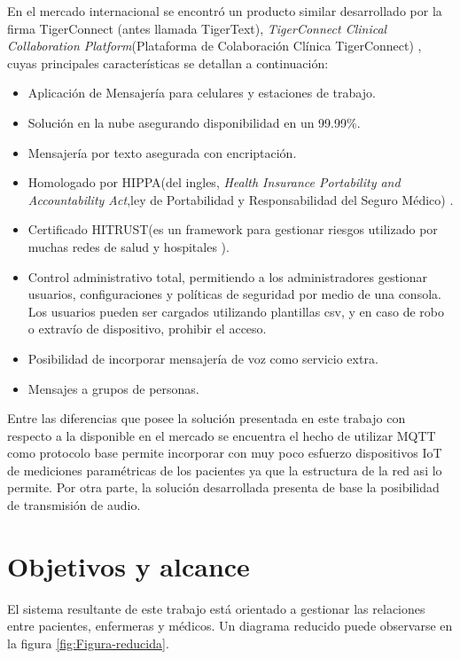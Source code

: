 En el mercado internacional se encontró un producto similar  desarrollado por la firma TigerConnect (antes llamada TigerText), \textit{TigerConnect Clinical Collaboration Platform}(Plataforma de Colaboración Clínica TigerConnect) \citep{WEBSITE:2}, cuyas principales características se detallan a continuación:
\begin{itemize}
\item Aplicación de Mensajería para celulares y estaciones de trabajo.
\item Solución en la nube asegurando disponibilidad en un 99.99\%.
\item Mensajería por texto asegurada con encriptación.  
\item Homologado por HIPPA(del ingles, \textit{Health Insurance Portability and Accountability Act},ley de Portabilidad y Responsabilidad del Seguro Médico)  \citep{WEBSITE:3}.  
\item Certificado HITRUST(es un framework para gestionar riesgos utilizado por muchas redes de salud y hospitales \citep{WEBSITE:1}).  
\item Control administrativo total, permitiendo a los administradores gestionar usuarios, configuraciones y políticas de seguridad por medio de una consola. Los usuarios pueden ser cargados utilizando plantillas csv, y en caso de robo o extravío de dispositivo, prohibir el acceso.  
\item Posibilidad de incorporar mensajería de voz como servicio extra.  
\item Mensajes a grupos de personas.  
\end{itemize}

Entre las diferencias que posee la solución presentada en este trabajo con respecto a la disponible en el mercado se encuentra el hecho de utilizar MQTT como protocolo base permite incorporar con muy poco esfuerzo dispositivos IoT de mediciones paramétricas de los pacientes ya que la estructura de la red asi lo permite. Por otra parte, la solución desarrollada presenta de base la posibilidad de transmisión de audio. 



\section{Objetivos y alcance}

El sistema resultante de este trabajo está orientado a gestionar las relaciones entre pacientes, enfermeras y médicos. Un diagrama reducido puede observarse en la figura \ref{fig:Figura-reducida}.  

